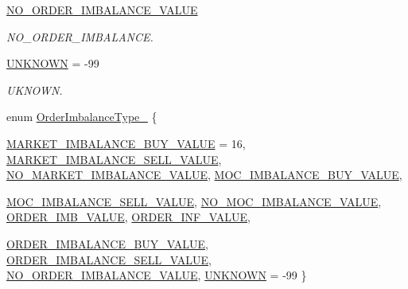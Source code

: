\begin{CompactItemize}
\hyperlink{classWombat_1_1MamdaOrderImbalanceType_1d6586915356b2aa4c6931591f172c1496509fb02f277e375ac4221111d96bcf}{NO\_\-ORDER\_\-IMBALANCE\_\-VALUE}
\begin{CompactList}\small\item\em NO\_\-ORDER\_\-IMBALANCE. \item\end{CompactList}\item 
\hyperlink{classWombat_1_1MamdaOrderImbalanceType_1d6586915356b2aa4c6931591f172c1433be8bffa474d3dcbc2cf0ccd3629572}{UNKNOWN} = -99
\begin{CompactList}\small\item\em UKNOWN. \item\end{CompactList}\item 
enum \hyperlink{classWombat_1_1MamdaOrderImbalanceType_1d6586915356b2aa4c6931591f172c14}{Order\-Imbalance\-Type\_\-} \{ \par
\hyperlink{classWombat_1_1MamdaOrderImbalanceType_1d6586915356b2aa4c6931591f172c1474847d51501d125a7d5932dcc295d702}{MARKET\_\-IMBALANCE\_\-BUY\_\-VALUE} =  16, 
\hyperlink{classWombat_1_1MamdaOrderImbalanceType_1d6586915356b2aa4c6931591f172c14f711ad219da3f908647a95db038a8d49}{MARKET\_\-IMBALANCE\_\-SELL\_\-VALUE}, 
\hyperlink{classWombat_1_1MamdaOrderImbalanceType_1d6586915356b2aa4c6931591f172c145ff2b46c7864880a48693d69a1297319}{NO\_\-MARKET\_\-IMBALANCE\_\-VALUE}, 
\hyperlink{classWombat_1_1MamdaOrderImbalanceType_1d6586915356b2aa4c6931591f172c14c4cc06c4366c3e4162b4317adc7c5ac6}{MOC\_\-IMBALANCE\_\-BUY\_\-VALUE}, 
\par
\hyperlink{classWombat_1_1MamdaOrderImbalanceType_1d6586915356b2aa4c6931591f172c148e4dbc7fb6d8821b2835a068e58e1eaa}{MOC\_\-IMBALANCE\_\-SELL\_\-VALUE}, 
\hyperlink{classWombat_1_1MamdaOrderImbalanceType_1d6586915356b2aa4c6931591f172c142ff26979e20d2b04aea2ebb10a34324c}{NO\_\-MOC\_\-IMBALANCE\_\-VALUE}, 
\hyperlink{classWombat_1_1MamdaOrderImbalanceType_1d6586915356b2aa4c6931591f172c1473cc791896fae438252f0c293d8ddeca}{ORDER\_\-IMB\_\-VALUE}, 
\hyperlink{classWombat_1_1MamdaOrderImbalanceType_1d6586915356b2aa4c6931591f172c14e27d761635e6a705c93273d70c9a68e1}{ORDER\_\-INF\_\-VALUE}, 
\par
\hyperlink{classWombat_1_1MamdaOrderImbalanceType_1d6586915356b2aa4c6931591f172c14fdc23112b702f43eed612464e5bbedf3}{ORDER\_\-IMBALANCE\_\-BUY\_\-VALUE}, 
\hyperlink{classWombat_1_1MamdaOrderImbalanceType_1d6586915356b2aa4c6931591f172c14e06b6e6ef1d914936904fa3b162c301d}{ORDER\_\-IMBALANCE\_\-SELL\_\-VALUE}, 
\hyperlink{classWombat_1_1MamdaOrderImbalanceType_1d6586915356b2aa4c6931591f172c1496509fb02f277e375ac4221111d96bcf}{NO\_\-ORDER\_\-IMBALANCE\_\-VALUE}, 
\hyperlink{classWombat_1_1MamdaOrderImbalanceType_1d6586915356b2aa4c6931591f172c1433be8bffa474d3dcbc2cf0ccd3629572}{UNKNOWN} =  -99
 \}
\end{CompactItemize}
